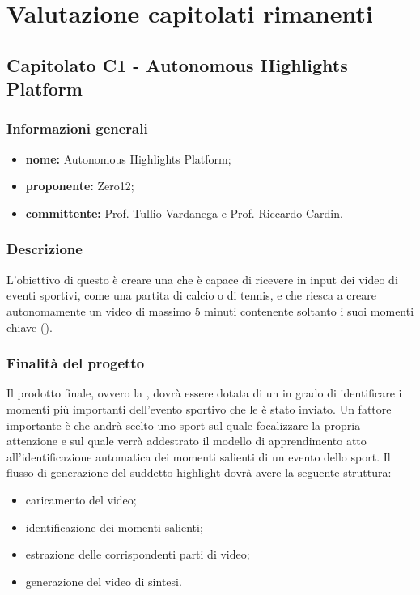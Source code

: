 \section{Valutazione capitolati rimanenti}
    \subsection{Capitolato C1 - Autonomous Highlights Platform}
       \subsubsection{Informazioni generali}
       \begin{itemize}
           \item \textbf{nome:} Autonomous Highlights Platform;
           \item \textbf{proponente:} Zero12;
           \item \textbf{committente:} Prof. Tullio Vardanega e Prof. Riccardo Cardin.
       \end{itemize}

    \subsubsection{Descrizione}
        L'obiettivo di questo  è creare una  che è capace di ricevere in input dei video di eventi sportivi, come una partita di calcio o di tennis, e che riesca a creare autonomamente un video di massimo 5 minuti contenente soltanto i suoi momenti chiave ().

    \subsubsection{Finalità del progetto}
        Il prodotto finale, ovvero la , dovrà essere dotata di un  in grado di identificare i momenti più importanti dell'evento sportivo che le è stato inviato. Un fattore importante è che andrà scelto uno sport sul quale focalizzare la propria attenzione e sul quale verrà addestrato il modello di apprendimento atto all'identificazione automatica dei momenti salienti di un evento dello sport.
        Il flusso di generazione del suddetto highlight dovrà avere la seguente struttura:
        \begin{itemize}
            \item caricamento del video;
            \item identificazione dei momenti salienti;
            \item estrazione delle corrispondenti parti di video;
            \item generazione del video di sintesi.
        \end{itemize}
